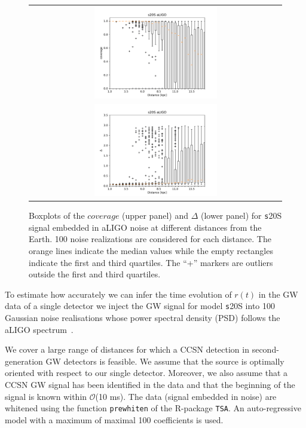 \begin{figure}[t]
  \centering
  \begin{tabular}{c}
    \includegraphics[width=0.5\textwidth]{plots/s20--SFHo_covpbb_boxplot_aLIGO} \\
    \includegraphics[width=0.5\textwidth]{plots/s20--SFHo_error_boxplot_aLIGO} \\
  \end{tabular}
    
 \caption{Boxplots of the $coverage$ (upper panel) and $\Delta$ (lower panel) for {\texttt s20S} signal embedded in aLIGO noise at different distances from the Earth. 100 noise realizations are considered for each distance. The orange lines indicate the median values while the empty rectangles indicate the first and third quartiles. The ``+'' markers are outliers outside the first and third quartiles.}
  \label{fig:s20results}
\end{figure}

To estimate how accurately we can infer the time evolution of $r(t)$ in the GW data of a single
detector we inject the GW signal for model {\texttt s20S} into 
100 Gaussian noise realisations whose power spectral density (PSD) follows the aLIGO
spectrum~\cite{aLIGOsens:2018}. %

We cover a large range of distances for which a CCSN detection in second-generation GW detectors is feasible. We assume that the source is optimally oriented with respect to our single detector. Moreover, we also assume that a CCSN GW signal has been identified in the data and that the beginning of the signal is known within {$\mathcal O$}(10 ms). The data (signal embedded in noise) are whitened using the function {\tt prewhiten} of the R-package {\tt TSA}. An auto-regressive model with a maximum of maximal 100 coefficients is used.    

